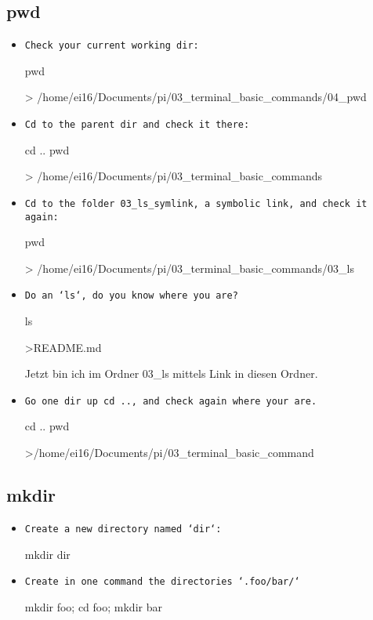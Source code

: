 \documentclass[10pt,a4paper]{scrartcl}
\begin{document}
\subsection{pwd}
\begin{itemize}

\item \texttt{Check your current working dir:}
\begin{terminalcode}
pwd

> /home/ei16/Documents/pi/03_terminal_basic_commands/04_pwd

\end{terminalcode}


\item \texttt{Cd to the parent dir and check it there:}
\begin{terminalcode}
cd ..
pwd

> /home/ei16/Documents/pi/03_terminal_basic_commands 

\end{terminalcode}

\item \texttt{Cd to the folder  03_ls_symlink, a symbolic link, and check it again:}

\begin{terminalcode}
	pwd

> /home/ei16/Documents/pi/03_terminal_basic_commands/03_ls
\end{terminalcode}


\item \texttt{Do an `ls`, do you know where you are?}
\begin{terminalcode}
ls

>README.md
\end{terminalcode}
Jetzt bin ich im Ordner 03_ls mittels Link in diesen Ordner.


\item \texttt{Go one dir up cd .., and check again where your are.}
\begin{terminalcode}
cd ..
pwd

>/home/ei16/Documents/pi/03_terminal_basic_command
\end{terminalcode}

\end{itemize}

\subsection{mkdir}

\begin{itemize}

\item \texttt{Create a new directory named `dir`:}
\begin{terminalcode}
mkdir dir
\end{terminalcode}
\item \texttt{Create in one command the directories `.foo/bar/`}
\begin{terminalcode}
mkdir foo; cd foo; mkdir bar
\end{terminalcode}
\end{itemize}
\end{document}
